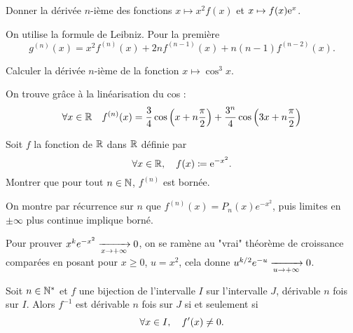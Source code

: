 \documentclass{magnoliaold}
\begin{document}
\begin{exos}
\exo %
  Donner la dérivée $n$-ième des fonctions $x\mapsto x^2f(x)$ et
  $x\mapsto f(x){\rm e}^x$.
\begin{sol}
On utilise la formule de Leibniz. 
Pour la première $$g^{(n)}(x)=x^2f^{(n)}(x)+2nf^{(n-1)}(x)+n(n-1)f^{(n-2)}(x).$$
\end{sol}
\exo Calculer la dérivée $n$-ième de la fonction $x\mapsto \cos^3 x$.
  \begin{sol}
  On trouve grâce à la linéarisation du cos :
  \[\forall x\in\mathbb{R} \quad
    f^{(n)}(x)=\frac{3}{4}\cos\left(x+n\frac{\pi}{2}\right)+
                  \frac{3^n}{4}\cos\left(3x+n\frac{\pi}{2}\right)\]  
  \end{sol}
\exo Soit $f$ la fonction de $\mathbb{R}$ dans $\mathbb{R}$ définie par
  \[\forall x\in\mathbb{R} ,\quad f(x)\coloneqq{\rm e}^{-x^2}.\]
  Montrer que pour tout $n\in\mathbb{N}$, $f^{(n)}$ est bornée.
  \begin{sol}
    On montre par récurrence sur $n$ que $f^{(n)}(x)=P_n(x)e^{-x^2}$, puis limites en $\pm \infty$ plus continue implique borné.
    
  Pour prouver $x^ke^{-x^2}\xrightarrow[x\rightarrow +\infty]{}0$, on se ramène au "vrai" théorème de croissance comparées en posant pour $x\geq 0$, $u=x^2$, cela donne $u^{k/2}e^{-u}\xrightarrow[u\rightarrow +\infty]{}0$. 
    \end{sol}
\end{exos}

\begin{proposition}[utile=-3]
Soit $n\in{\mathbb{N}^*}$ et $f$ une bijection de l'intervalle $I$ sur l'intervalle
$J$, dérivable $n$ fois sur $I$. Alors $f^{-1}$ est dérivable $n$ fois sur $J$ si et seulement
si
\[\forall x\in I ,\quad f'(x)\neq 0.\]
\end{proposition}
\end{document}
